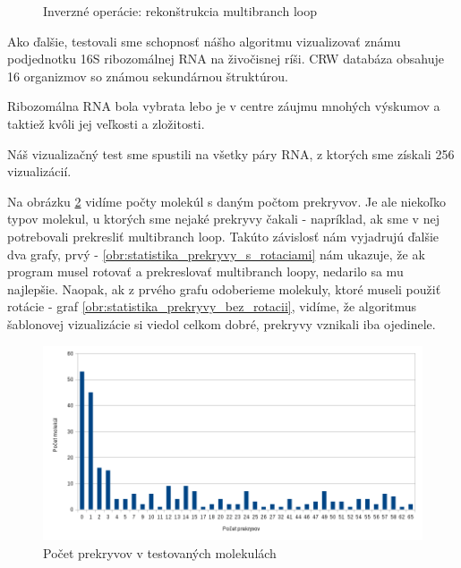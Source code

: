 \begin{figure}[H]
\begin{subfigure}{0.3\textwidth}
  \end{subfigure}
  \caption{Inverzné operácie: rekonštrukcia multibranch loop}
  \label{obr:delete_insert_multibranch_loop}
\end{figure}


Ako ďalšie, testovali sme schopnosť nášho algoritmu vizualizovať známu podjednotku 16S ribozomálnej RNA
na živočisnej ríši. CRW databáza obsahuje 16 organizmov so známou sekundárnou štruktúrou.

Ribozomálna RNA bola vybrata lebo je v centre záujmu mnohých výskumov a taktiež kvôli jej veľkosti
a zložitosti.

Náš vizualizačný test sme spustili na všetky páry RNA, z ktorých sme získali 256 vizualizácií.


Na obrázku \ref{obr:statistika_prekryvy} vidíme počty molekúl s daným počtom prekryvov. 
Je ale niekoľko typov molekul, u ktorých sme nejaké prekryvy čakali - napríklad, ak sme v nej
potrebovali prekresliť multibranch loop. Takúto závislosť nám vyjadrujú ďalšie dva grafy,
prvý - \ref{obr:statistika_prekryvy_s_rotaciami} nám ukazuje, že ak program musel rotovať
a prekreslovať multibranch loopy, nedarilo sa mu najlepšie. Naopak, ak z prvého grafu
odoberieme molekuly, ktoré museli použiť rotácie - graf \ref{obr:statistika_prekryvy_bez_rotacii},
vidíme, že algoritmus šablonovej vizualizácie si viedol celkom dobré, prekryvy vznikali iba ojedinele.


\begin{figure}
  \includegraphics[width=1\textwidth]{../img/statistika/prekryvy-pocetmolekul}
  \caption{Počet prekryvov v testovaných molekulách}
  \label{obr:statistika_prekryvy}
\end{figure}


